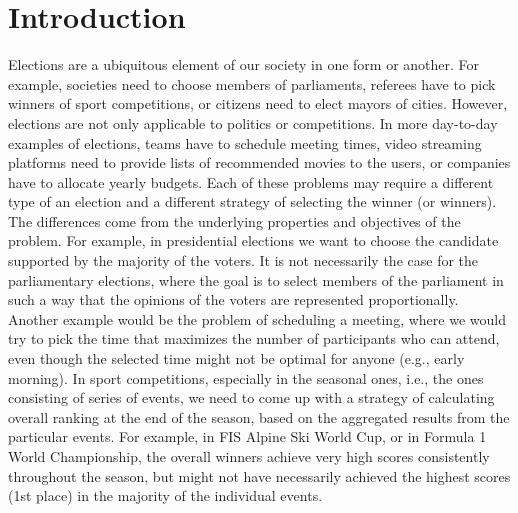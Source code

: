 \chapter{Introduction}  %

\ifpdf
    \graphicspath{{Chapter1/Figs/Raster/}{Chapter1/Figs/PDF/}{Chapter1/Figs/}}
\else
    \graphicspath{{Chapter1/Figs/Vector/}{Chapter1/Figs/}}
\fi

Elections are a ubiquitous element of our society in one form or another.
For example, societies need to choose members of parliaments, referees have to pick winners of sport competitions,
or citizens need to elect mayors of cities.
However, elections are not only applicable to politics or competitions.
In more day-to-day examples of elections, teams have to schedule meeting times,
video streaming platforms need to provide lists of recommended movies to the users,
or companies have to allocate yearly budgets.
Each of these problems may require a different type of an election and a different strategy of selecting the winner (or winners).
The differences come from the underlying properties and objectives of the problem.
For example, in presidential elections we want to choose the candidate supported by the majority of the voters.
It is not necessarily the case for the parliamentary elections, where the goal is to select members of the parliament in such a way that 
the opinions of the voters are represented proportionally. 
Another example would be the problem of scheduling a meeting, where we would try to pick the time that
maximizes the number of participants who can attend, even though the selected time might not be optimal for anyone (e.g., early morning).
In sport competitions, especially in the seasonal ones, i.e., the ones consisting of series of events,
we need to come up with a strategy of calculating overall ranking at the end of the season,
based on the aggregated results from the particular events.
For example, in FIS Alpine Ski World Cup, or in Formula 1 World Championship,
the overall winners achieve very high scores consistently throughout the season,
but might not have necessarily achieved the highest scores (1st place) in the majority of the individual events.

